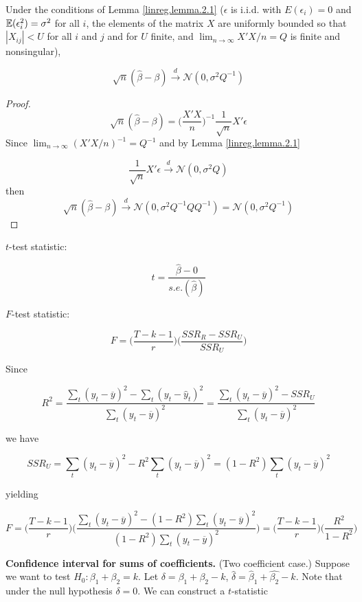 \begin{theorem}Under the conditions of Lemma \ref{linreg.lemma.2.1} (\(\epsilon\) is i.i.d. with \(E(\epsilon_i) = 0\) and \(\mathbb{E}(\epsilon_i^2) = \sigma^2\) for all \(i\), the elements of the matrix \(X\) are uniformly bounded so that \(|X_{ij}| < U \) for all \(i\) and \(j\) and for \(U\) finite, and \(\lim_{n \to \infty} X'X/n = Q\) is finite and nonsingular), 

\[
\sqrt{n}(\hat{\beta} - \beta) \xrightarrow{d} \mathcal{N}(0, \sigma^2 Q^{-1})
\]
\end{theorem}
\begin{proof}

\[
\sqrt{n}(\hat{\beta} - \beta) = \bigg( \frac{X'X}{n} \bigg)^{-1} \frac{1}{\sqrt{n}} X' \epsilon
\]
Since \(\lim_{n \to \infty} (X'X/n)^{-1} = Q^{-1}\) and by Lemma \ref{linreg.lemma.2.1}

\[
\frac{1}{\sqrt{n}} X' \epsilon \xrightarrow{d} \mathcal{N}(0, \sigma^2 Q)
\]
then
\[
\sqrt{n}(\hat{\beta} - \beta) \xrightarrow{d}  \mathcal{N}(0, \sigma^2 Q^{-1}QQ^{-1}) = \mathcal{N}(0, \sigma^2 Q^{-1})
\]
\end{proof}

\(t\)-test statistic:

\[
t = \frac{\hat{\beta} - 0}{s.e.(\hat{\beta})}
\]

\(F\)-test statistic:

\[
F = \bigg( \frac{T - k - 1}{r}\bigg) \bigg( \frac{SSR_R - SSR_U} {SSR_U} \bigg)
\]

Since 

\[
R^2 = \frac{ \sum_t(y_t - \overline{y})^2 - \sum_t(y_t - \hat{y}_t)^2}{ \sum_t(y_t - \overline{y})^2} =  \frac{ \sum_t(y_t - \overline{y})^2 - SSR_U}{ \sum_t(y_t - \overline{y})^2} 
\]

we have

\[
SSR_U =  \sum_t(y_t - \overline{y})^2 - R^2  \sum_t(y_t - \overline{y})^2  =  (1 - R^2)\sum_t(y_t - \overline{y})^2
\]

yielding

\[
F = \bigg( \frac{T - k - 1}{r} \bigg) \bigg( \frac{\sum_t(y_t - \overline{y})^2 - (1 - R^2)\sum_t(y_t - \overline{y})^2}{(1 - R^2)\sum_t(y_t - \overline{y})^2} \bigg) = \bigg( \frac{T - k - 1}{r} \bigg) \bigg( \frac{R^2}{1 - R^2} \bigg)
\]

\textbf{Confidence interval for sums of coefficients.} (Two coefficient case.) Suppose we want to test \(H_0: \beta_1 + \beta_2 = k\). Let \(\delta = \beta_1 + \beta_2 -k\), \(\hat{\delta} = \hat{\beta}_1 + \hat{\beta_2} -k\). Note that under the null hypothesis \(\delta = 0\). We can construct a \(t\)-statistic

